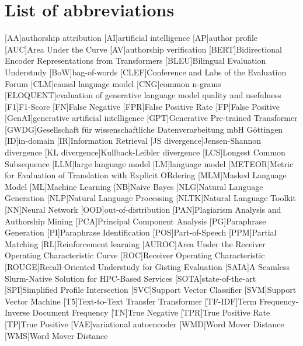 \chapter*{List of abbreviations}

\begin{acronym}[XXXXXXXXX]
    [AA]{authorship attribution}
    [AI]{artificial intelligence}
    [AP]{author profile}
    [AUC]{Area Under the Curve}
    [AV]{authorship verification}
    [BERT]{Bidirectional Encoder Representations from Transformers}
    [BLEU]{Bilingual Evaluation Understudy}
    [BoW]{bag-of-words}
    [CLEF]{Conference and Labs of the Evaluation Forum}
    [CLM]{causal language model}
    [CNG]{common n-grams}
    [ELOQUENT]{evaluation of generative language model quality and usefulness}
    [F1]{F1-Score}
    [FN]{False Negative}
    [FPR]{False Positive Rate}
    [FP]{False Positive}
    [GenAI]{generative artificial intelligence}
    [GPT]{Generative Pre-trained Transformer}
    [GWDG]{Gesellschaft für wissenschaftliche Datenverarbeitung mbH Göttingen}
    [ID]{in-domain}
    [IR]{Information Retrieval}
    [JS divergence]{Jensen-Shannon divergence}
    [KL divergence]{Kullback-Leibler divergence}
    [LCS]{Longest Common Subsequence}
    [LLM]{large language model}
    [LM]{language model}
    [METEOR]{Metric for Evaluation of Translation with Explicit ORdering}
    [MLM]{Masked Language Model}
    [ML]{Machine Learning}
    [NB]{Naive Bayes}
    [NLG]{Natural Language Generation}
    [NLP]{Natural Language Processing}
    [NLTK]{Natural Language Toolkit}
    [NN]{Neural Network}
    [OOD]{out-of-distribution}
    [PAN]{Plagiarism Analysis and Authorship Mining} %
    [PCA]{Principal Component Analysis}
    [PG]{Paraphrase Generation}
    [PI]{Paraphrase Identification}
    [POS]{Part-of-Speech}
    [PPM]{Partial Matching}
    [RL]{Reinforcement learning}
    [AUROC]{Area Under the Receiver Operating Characteristic Curve}
    [ROC]{Receiver Operating Characteristic}
    [ROUGE]{Recall-Oriented Understudy for Gisting Evaluation}
    [SAIA]{A Seamless Slurm-Native Solution for HPC-Based Services}
    [SOTA]{state-of-the-art}
    [SPI]{Simplified Profile Intersection}
    [SVC]{Support Vector Classifier}
    [SVM]{Support Vector Machine}
    [T5]{Text-to-Text Transfer Transformer}
    [TF-IDF]{Term Frequency-Inverse Document Frequency}
    [TN]{True Negative}
    [TPR]{True Positive Rate}
    [TP]{True Positive}
    [VAE]{variational autoencoder}
    [WMD]{Word Mover Distance}
    [WMS]{Word Mover Distance}
\end{acronym}

